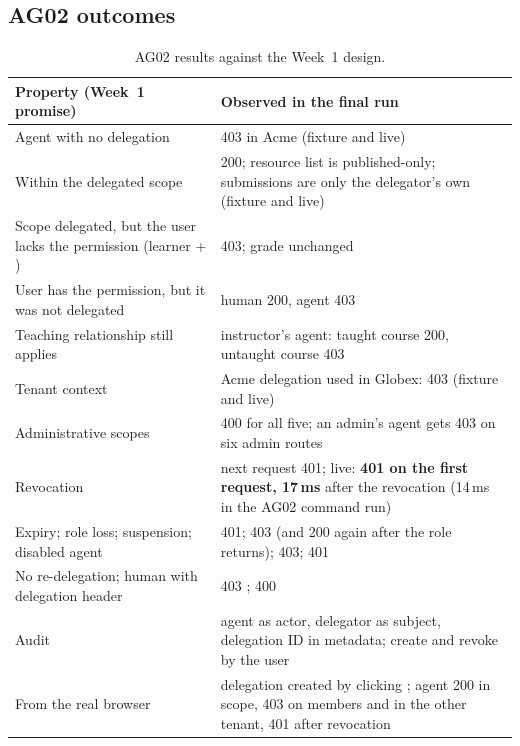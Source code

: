 \subsection{AG02 outcomes}
\begin{table}[H]
\centering
\small
\begin{tabularx}{\textwidth}{@{}L L@{}}
\toprule
\textbf{Property (Week~1 promise)} & \textbf{Observed in the final run}\\
\midrule
Agent with no delegation & 403 in Acme (fixture and live)\\
Within the delegated scope & 200; resource list is published-only; submissions are only the delegator's own (fixture and live)\\
Scope delegated, but the user lacks the permission (learner + ) & 403; grade unchanged\\
User has the permission, but it was not delegated & human 200, agent 403\\
Teaching relationship still applies & instructor's agent: taught course 200, untaught course 403\\
Tenant context & Acme delegation used in Globex: 403 (fixture and live)\\
Administrative scopes & 400  for all five; an admin's agent gets 403 on six admin routes\\
Revocation & next request 401; live: \textbf{401 on the first request, 17\,ms} after the revocation (14\,ms in the AG02 command run)\\
Expiry; role loss; suspension; disabled agent & 401; 403 (and 200 again after the role returns); 403; 401\\
No re-delegation; human with delegation header & 403 ; 400 \\
Audit & agent as actor, delegator as subject, delegation ID in metadata; create and revoke by the user\\
From the real browser & delegation created by clicking ; agent 200 in scope, 403 on members and in the other tenant, 401 after revocation\\
\bottomrule
\end{tabularx}
\caption{AG02 results against the Week~1 design.}
\end{table}

